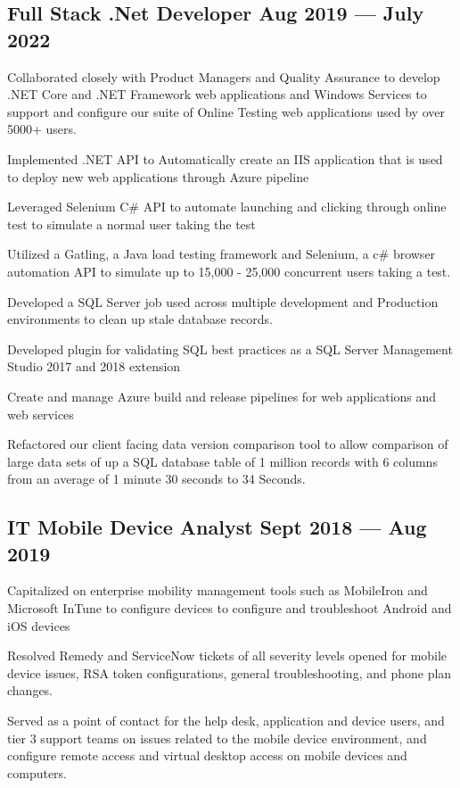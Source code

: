 \documentclass[letter,10pt]{article}
\begin{document}
\subsection{{Full Stack .Net Developer \hfill Aug 2019 --- July 2022}}
\begin{zitemize}
\item Collaborated closely with Product Managers and Quality Assurance to develop .NET Core and .NET Framework web applications and Windows Services to support and configure our suite of Online Testing web applications used by over 5000+ users.
\item Implemented .NET API to Automatically create an IIS application that is used to deploy new web applications through Azure pipeline
\item Leveraged Selenium C\# API to automate launching and clicking through online test to simulate a normal user taking the test
\item Utilized a Gatling, a Java load testing framework and Selenium, a c# browser automation API to simulate up to 15,000 - 25,000 concurrent users taking a test.
\item Developed a SQL Server job used across multiple development and Production environments to clean up stale database records. 
\item Developed plugin for validating SQL best practices as a SQL Server Management Studio 2017 and 2018 extension
\item Create and manage Azure build and release pipelines for web applications and web services
\item Refactored our client facing data version comparison tool to allow comparison of large data sets of up a SQL database table of 1 million records with 6 columns from an average of 1 minute 30 seconds to  34 Seconds.
\end{zitemize}

\subsection{{IT Mobile Device Analyst \hfill Sept 2018 --- Aug 2019}}
\begin{zitemize}
\item Capitalized on enterprise mobility management tools such as MobileIron and Microsoft InTune to configure devices to configure and troubleshoot Android and iOS devices
\item Resolved Remedy and ServiceNow tickets of all severity levels opened for mobile device issues, RSA token configurations, general troubleshooting, and phone plan changes.
\item Served as a point of contact for the help desk, application and device users, and tier 3 support
teams on issues related to the mobile device environment, and configure remote access and virtual desktop
access on mobile devices and computers.
\end{zitemize}
\end{document}
